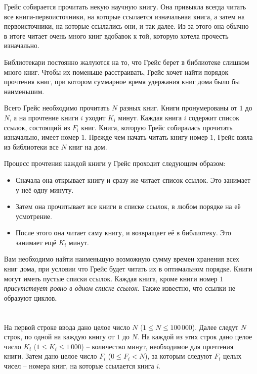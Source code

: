 \ifx\boi\undefined\fi
\def\version{jury-1}

Грейс собирается прочитать некую научную книгу. Она привыкла всегда читать все книги-первоисточники, на которые ссылается изначальная книга, а 
затем на первоисточники, на которые ссылались они, и так далее. Из-за этого она обычно в итоге читает очень много книг вдобавок к той, которую хотела прочесть изначально.

Библиотекари постоянно жалуются на то, что Грейс берет в библиотеке слишком много книг. Чтобы их поменьше расстраивать, Грейс хочет
найти порядок прочтения книг, при котором суммарное время удержания книг дома было бы наименьшим.

Всего Грейс необходимо прочитать $N$ разных книг. Книги пронумерованы от $1$ до $N$, а на прочтение книги $i$ уходит $K_i$ минут.
Каждая книга $i$ содержит список ссылок, состоящий из $F_i$ книг.
Книга, которую Грейс собиралась прочитать изначально, имеет номер $1$.
Прежде чем начать читать книгу номер $1$, Грейс взяла из библиотеки все $N$ книг на дом.

Процесс прочтения каждой книги у Грейс проходит следующим образом:

\begin{itemize}
\item Сначала она открывает книгу и сразу же читает список ссылок. Это занимает у неё одну минуту.
\item Затем она прочитывает все книги в списке ссылок, в любом порядке на её усмотрение.
\item После этого она читает саму книгу, и возвращает её в библиотеку. Это занимает ещё $K_i$ минут.
\end{itemize}

Вам необходимо найти наименьшую возможную сумму времен хранения всех книг дома, при условии что Грейс будет читать их в оптимальном порядке.
Книги могут иметь пустые списки ссылок. Каждая книга, кроме книги номер $1$ {\em присутствует ровно в одном списке ссылок}.
Также известно, что ссылки не образуют циклов.

\section*{}
На первой строке ввода дано целое число $N$ ($1 \le N \le 100\,000$).
Далее следут $N$ строк, по одной на каждую книгу от $1$ до $N$.
На каждой из этих строк дано целое число $K_i$ ($1 \le K_i \le 1\,000$) -- количество минут, необходимое для прочтения книги.
Затем дано целое число $F_i$ ($0 \le F_i < N$), за которым следуют $F_i$ целых чисел -- номера книг, на которые ссылается книга $i$.

